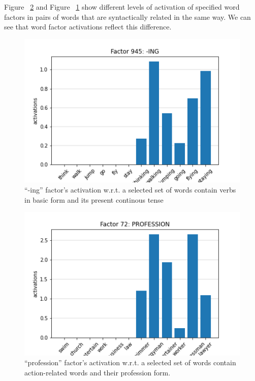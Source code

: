 \documentclass[10pt, a4paper, twocolumn]{article} %
\begin{document}
Figure ~\ref{fig:pro} and Figure ~\ref{fig:ing} show different levels of activation of specified word factors in pairs of words that are syntactically related in the same way. We can see that word factor activations reflect this difference.


\begin{figure}
	\includegraphics[width=\linewidth]{-ing_factor.png} %
	\caption{“-ing” factor’s activation w.r.t. a selected set of words contain verbs in basic form and its present continous tense} %
	\label{fig:ing} %
\end{figure}

\begin{figure}
	\includegraphics[width=\linewidth]{profession_factor.png} %
	\caption{“profession” factor’s activation w.r.t. a selected set of words contain action-related words and
their profession form.} %
	\label{fig:pro} %
\end{figure}
\end{document}
